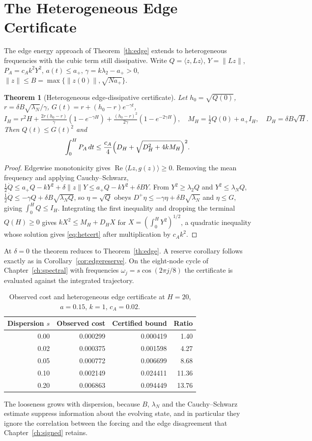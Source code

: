 \documentclass[11pt,notitlepage]{report}
\newtheorem{theorem}{Theorem}[chapter]
\theoremstyle{definition}
\theoremstyle{remark}
\newcommand{\re}{\operatorname{Re}}
\begin{document}
\section{The Heterogeneous Edge Certificate}
The edge energy approach of Theorem~\ref{th:edge} extends to heterogeneous frequencies with the cubic term still dissipative. Write $Q=\langle z,Lz\rangle$, $Y=\|Lz\|$, $P_A=c_Ak^2Y^2$, $a(t)\le a_+$, $\gamma=k\lambda_2-a_+>0$, $\|z\|\le B=\max\{\|z(0)\|,\sqrt{Na_+}\}$.
\begin{theorem}[Heterogeneous edge-dissipative certificate]\label{th:hetedge}
Let $h_0=\sqrt{Q(0)}$, $r=\delta B\sqrt{\lambda_N}/\gamma$, $G(t)=r+(h_0-r)e^{-\gamma t}$,
\[
I_H=r^2H+\tfrac{2r(h_0-r)}\gamma(1-e^{-\gamma H})+\tfrac{(h_0-r)^2}{2\gamma}(1-e^{-2\gamma H}),\quad M_H=\tfrac12Q(0)+a_+I_H,\quad D_H=\delta B\sqrt H.
\]
Then $Q(t)\le G(t)^2$ and
\begin{equation}\label{eq:hetcert}
\int_0^HP_A\,dt\le\frac{c_A}4\Bigl(D_H+\sqrt{D_H^2+4kM_H}\Bigr)^2.
\end{equation}
\end{theorem}
\begin{proof}
Edgewise monotonicity gives $\re\langle Lz,g(z)\rangle\ge0$. Removing the mean frequency and applying Cauchy--Schwarz, $\tfrac12\dot Q\le a_+Q-kY^2+\delta\|z\|Y\le a_+Q-kY^2+\delta BY$. From $Y^2\ge\lambda_2Q$ and $Y^2\le\lambda_NQ$, $\tfrac12\dot Q\le-\gamma Q+\delta B\sqrt{\lambda_NQ}$, so $\eta=\sqrt Q$ obeys $D^+\eta\le-\gamma\eta+\delta B\sqrt{\lambda_N}$ and $\eta\le G$, giving $\int_0^HQ\le I_H$. Integrating the first inequality and dropping the terminal $Q(H)\ge0$ gives $kX^2\le M_H+D_HX$ for $X=(\int_0^HY^2)^{1/2}$, a quadratic inequality whose solution gives \eqref{eq:hetcert} after multiplication by $c_Ak^2$.
\end{proof}
At $\delta=0$ the theorem reduces to Theorem~\ref{th:edge}. A reserve corollary follows exactly as in Corollary~\ref{cor:edgereserve}. On the eight-node cycle of Chapter~\ref{ch:spectral} with frequencies $\omega_j=s\cos(2\pi j/8)$ the certificate is evaluated against the integrated trajectory.
\begin{table}[ht]\centering\small
\caption{Observed cost and heterogeneous edge certificate at $H=20$, $a=0.15$, $k=1$, $c_A=0.02$.}
\begin{tabular}{rrrr}\toprule
Dispersion $s$&Observed cost&Certified bound&Ratio\\\midrule
0.00&0.000299&0.000419&1.40\\
0.02&0.000375&0.001598&4.27\\
0.05&0.000772&0.006699&8.68\\
0.10&0.002149&0.024411&11.36\\
0.20&0.006863&0.094449&13.76\\\bottomrule
\end{tabular}
\end{table}
The looseness grows with dispersion, because $B$, $\lambda_N$ and the Cauchy--Schwarz estimate suppress information about the evolving state, and in particular they ignore the correlation between the forcing and the edge disagreement that Chapter~\ref{ch:signed} retains.
\end{document}
